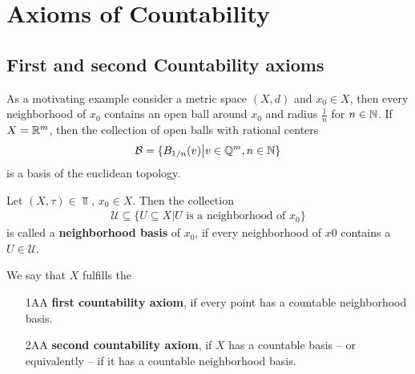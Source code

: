 \section{Axioms of Countability}
\subsection{First and second Countability axioms}


As a motivating example consider a metric space $(X,d)$ and $x_0 \in X$, then every neighborhood of $x_0$ contains an open ball around $x_0$ and radius $\tfrac{1}{n}$ for $n \in \mathbb{N}$.
If $X = \mathbb{R}^{m}$, then the collection of open balls with rational centers
\begin{align*}
  \mathcal{B} = \{B_{1/n}(v) \big\vert v\in \mathbb{Q}^{m}, n \in \mathbb{N}\}
\end{align*}
is a basis of the euclidean topology.



\begin{dfn}[]
  Let $(X,\tau) \in \Top$, $x_0 \in X$. Then the collection
  \begin{align*}
    \mathcal{U} \subseteq \{U \subseteq X \big\vert U \text{ is a neighborhood of }x_0\}
  \end{align*}
  is called a \textbf{neighborhood basis} of $x_0$, if every neighborhood of $x0$ contains a $U \in \mathcal{U}$.

  We say that $X$ fulfills the 
  \begin{itemize}
    \item[1AA] \textbf{first countability axiom}, if every point has a countable neighborhood basis.
    \item[2AA] \textbf{second countability axiom}, if $X$ has a countable basis -- or equivalently -- if it has a countable neighborhood basis.
  \end{itemize}
\end{dfn}

